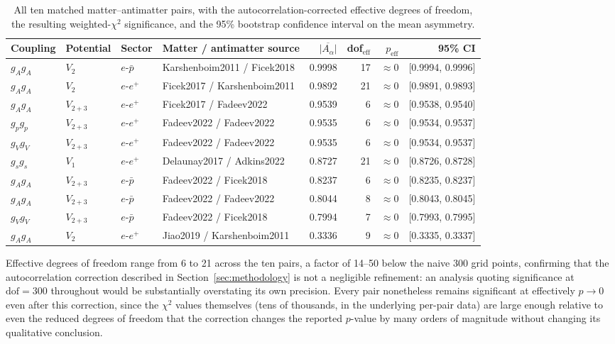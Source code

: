 \documentclass[main]{subfiles}
\begin{document}
\begin{table}[h]
\centering
\small
\begin{tabular}{@{}llllrrrr@{}}
\toprule
Coupling & Potential & Sector & Matter / antimatter source & $\overline{|A_\alpha|}$ & dof$_{\text{eff}}$ & $p_{\text{eff}}$ & 95\% CI \\
\midrule
$g_Ag_A$    & $V_2$    & $e$-$\bar p$ & Karshenboim2011 / Ficek2018     & 0.9998 & 17 & $\approx0$ & [0.9994, 0.9996] \\
$g_Ag_A$    & $V_2$    & $e$-$e^+$    & Ficek2017 / Karshenboim2011     & 0.9892 & 21 & $\approx0$ & [0.9891, 0.9893] \\
$g_Ag_A$    & $V_{2+3}$& $e$-$e^+$    & Ficek2017 / Fadeev2022          & 0.9539 & 6  & $\approx0$ & [0.9538, 0.9540] \\
$g_pg_p$    & $V_{2+3}$& $e$-$e^+$    & Fadeev2022 / Fadeev2022         & 0.9535 & 6  & $\approx0$ & [0.9534, 0.9537] \\
$g_Vg_V$    & $V_{2+3}$& $e$-$e^+$    & Fadeev2022 / Fadeev2022         & 0.9535 & 6  & $\approx0$ & [0.9534, 0.9537] \\
$g_sg_s$    & $V_1$     & $e$-$e^+$    & Delaunay2017 / Adkins2022       & 0.8727 & 21 & $\approx0$ & [0.8726, 0.8728] \\
$g_Ag_A$    & $V_{2+3}$& $e$-$\bar p$ & Fadeev2022 / Ficek2018          & 0.8237 & 6  & $\approx0$ & [0.8235, 0.8237] \\
$g_Ag_A$    & $V_{2+3}$& $e$-$\bar p$ & Fadeev2022 / Fadeev2022         & 0.8044 & 8  & $\approx0$ & [0.8043, 0.8045] \\
$g_Vg_V$    & $V_{2+3}$& $e$-$\bar p$ & Fadeev2022 / Ficek2018          & 0.7994 & 7  & $\approx0$ & [0.7993, 0.7995] \\
$g_Ag_A$    & $V_2$    & $e$-$e^+$    & Jiao2019 / Karshenboim2011      & 0.3336 & 9  & $\approx0$ & [0.3335, 0.3337] \\
\bottomrule
\end{tabular}
\caption{All ten matched matter--antimatter pairs, with the autocorrelation-corrected effective degrees of freedom, the resulting weighted-$\chi^2$ significance, and the 95\% bootstrap confidence interval on the mean asymmetry.}
\label{tab:pairs}
\end{table}
Effective degrees of freedom range from 6 to 21 across the ten pairs, a
factor of 14--50 below the naive 300 grid points, confirming that the
autocorrelation correction described in Section~\ref{sec:methodology} is not
a negligible refinement: an analysis quoting significance at $\mathrm{dof}=300$
throughout would be substantially overstating its own precision. Every pair
nonetheless remains significant at effectively $p\to0$ even after this
correction, since the $\chi^2$ values themselves (tens of thousands, in the
underlying per-pair data) are large enough relative to even the reduced
degrees of freedom that the correction changes the reported $p$-value by
many orders of magnitude without changing its qualitative conclusion.
\end{document}

